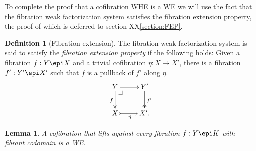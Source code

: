 \documentclass[11pt]{article}
\makeatletter
\newcommand{\pbcorner}[1][dr]{\save*!/#1-1.2pc/#1:(-1,1)@^{|-}\restore}
\newcommand{\ra}{\ensuremath{\rightarrow}}
\newtheorem{proposition}[theorem]{Proposition}
\newtheorem{lemma}[theorem]{Lemma}
\theoremstyle{remark}
\theoremstyle{definition}
\newtheorem{definition}[theorem]{Definition}
\makeatother
\begin{document}

To complete the proof that a cofibration WHE is a WE we will use the fact that the fibration weak factorization system satisfies the fibration extension property, the proof of which is deferred to section XX\ref{section:FEP}.

\begin{definition}[Fibration extension]\label{def:fibextreplace}
The fibration weak factorization system is said to satisfy the \emph{fibration extension property} if the following holds: Given a fibration $ f : Y \epi X$ and a trivial cofibration $\eta: X\ra X'$,
there is a fibration $f' : Y' \epi X'$ such that $f$ is a pullback of $f'$ along $\eta$. 
\begin{equation}\label{diagram:FEP}
\xymatrix{
Y \ar@{->>}[d]_{f} \ar[r]  \pbcorner & Y' \ar@{>>}[d]^{f'} \\
X \ar@{>->}[r]_{\eta} &  X'.
}
\end{equation}
\end{definition}

\begin{lemma}\label{lemma:CofWEiffFibLift}
A cofibration that lifts against every fibration $f : Y\epi K$ with fibrant codomain is a WE.
\end{lemma}
\end{document}
